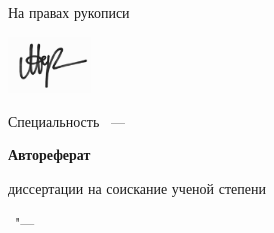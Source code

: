 \thispagestyle{empty}

\vspace{0pt plus1fill} %
\begin{flushright}
  \large{На правах рукописи}
	
\end{flushright}
\begin{flushright}
\includegraphics[height=1.5cm]{images/h81.png}
\end{flushright}
\vspace{0pt plus3fill} %
\begin{center}
{\large \thesisAuthor}
\end{center}

\vspace{0pt plus3fill} %
\begin{center}
\textbf {\Large \thesisTitle}

\vspace{0pt plus3fill} %
{\large Специальность \thesisSpecialtyNumber~--- \thesisSpecialtyTitle}

\vspace{0pt plus1.5fill} %
\textbf{\Large{Автореферат}}\par
\large{диссертации на соискание ученой степени\par \thesisDegree}
\end{center}

\vspace{0pt plus4fill} %
\begin{center}
{\large{\thesisCity\ "--- \thesisYear}}
\end{center}


